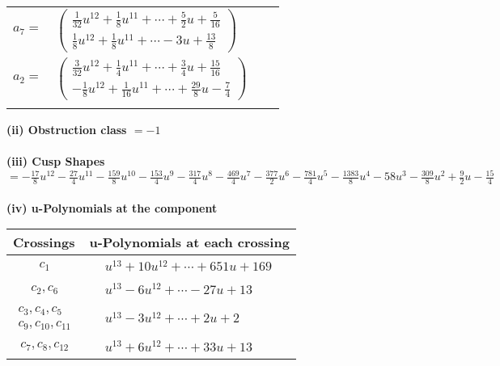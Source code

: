 \documentclass[1p]{elsarticle_modified}
\theoremstyle{definition}
\begin{document}
\begin{tabular}{m{7pt} m{180pt} m{7pt} m{180pt} }
\flushright $a_{7}=$&$\begin{pmatrix}\frac{1}{32} u^{12}+\frac{1}{8} u^{11}+\cdots+\frac{5}{2} u+\frac{5}{16}\\\frac{1}{8} u^{12}+\frac{1}{8} u^{11}+\cdots-3 u+\frac{13}{8}\end{pmatrix}$ \\
\flushright $a_{2}=$&$\begin{pmatrix}\frac{3}{32} u^{12}+\frac{1}{4} u^{11}+\cdots+\frac{3}{4} u+\frac{15}{16}\\-\frac{1}{8} u^{12}+\frac{1}{16} u^{11}+\cdots+\frac{29}{8} u-\frac{7}{4}\end{pmatrix}$\\&\end{tabular}
\flushleft \textbf{(ii) Obstruction class $= -1$}\\~\\
\flushleft \textbf{(iii) Cusp Shapes $= -\frac{17}{8} u^{12}-\frac{27}{4} u^{11}-\frac{159}{8} u^{10}-\frac{153}{4} u^9-\frac{317}{4} u^8-\frac{469}{4} u^7-\frac{377}{2} u^6-\frac{781}{4} u^5-\frac{1383}{8} u^4-58 u^3-\frac{309}{8} u^2+\frac{9}{2} u-\frac{15}{4}$}\\~\\
\newpage\renewcommand{\arraystretch}{1}
\flushleft \textbf{(iv) u-Polynomials at the component}\newline \\
\begin{tabular}{m{50pt}|m{274pt}}
Crossings & \hspace{64pt}u-Polynomials at each crossing \\
\hline $$\begin{aligned}c_{1}\end{aligned}$$&$\begin{aligned}
&u^{13}+10 u^{12}+\cdots+651 u+169
\end{aligned}$\\
\hline $$\begin{aligned}c_{2},c_{6}\end{aligned}$$&$\begin{aligned}
&u^{13}-6 u^{12}+\cdots-27 u+13
\end{aligned}$\\
\hline $$\begin{aligned}c_{3},c_{4},c_{5}\\c_{9},c_{10},c_{11}\end{aligned}$$&$\begin{aligned}
&u^{13}-3 u^{12}+\cdots+2 u+2
\end{aligned}$\\
\hline $$\begin{aligned}c_{7},c_{8},c_{12}\end{aligned}$$&$\begin{aligned}
&u^{13}+6 u^{12}+\cdots+33 u+13
\end{aligned}$\\
\hline
\end{tabular}\\~\\
\end{document}
